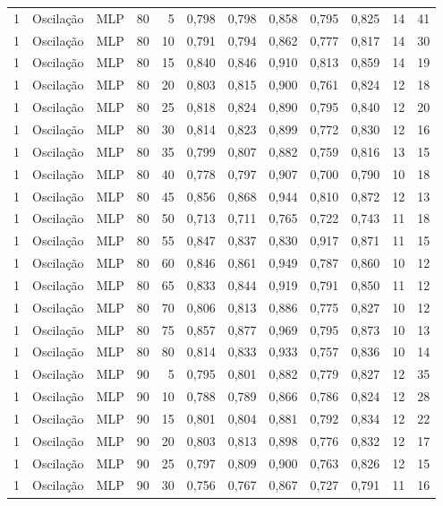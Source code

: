 \begin{longtable}{ccclrrrrrrrr}
1 & Oscilação & MLP & 80 & 5 & 0,798 & 0,798 & 0,858 & 0,795 & 0,825 & 14 & 41 \\
1 & Oscilação & MLP & 80 & 10 & 0,791 & 0,794 & 0,862 & 0,777 & 0,817 & 14 & 30 \\
1 & Oscilação & MLP & 80 & 15 & 0,840 & 0,846 & 0,910 & 0,813 & 0,859 & 14 & 19 \\
1 & Oscilação & MLP & 80 & 20 & 0,803 & 0,815 & 0,900 & 0,761 & 0,824 & 12 & 18 \\
1 & Oscilação & MLP & 80 & 25 & 0,818 & 0,824 & 0,890 & 0,795 & 0,840 & 12 & 20 \\
1 & Oscilação & MLP & 80 & 30 & 0,814 & 0,823 & 0,899 & 0,772 & 0,830 & 12 & 16 \\
1 & Oscilação & MLP & 80 & 35 & 0,799 & 0,807 & 0,882 & 0,759 & 0,816 & 13 & 15 \\
1 & Oscilação & MLP & 80 & 40 & 0,778 & 0,797 & 0,907 & 0,700 & 0,790 & 10 & 18 \\
1 & Oscilação & MLP & 80 & 45 & 0,856 & 0,868 & 0,944 & 0,810 & 0,872 & 12 & 13 \\
1 & Oscilação & MLP & 80 & 50 & 0,713 & 0,711 & 0,765 & 0,722 & 0,743 & 11 & 18 \\
1 & Oscilação & MLP & 80 & 55 & 0,847 & 0,837 & 0,830 & 0,917 & 0,871 & 11 & 15 \\
1 & Oscilação & MLP & 80 & 60 & 0,846 & 0,861 & 0,949 & 0,787 & 0,860 & 10 & 12 \\
1 & Oscilação & MLP & 80 & 65 & 0,833 & 0,844 & 0,919 & 0,791 & 0,850 & 11 & 12 \\
1 & Oscilação & MLP & 80 & 70 & 0,806 & 0,813 & 0,886 & 0,775 & 0,827 & 10 & 12 \\
1 & Oscilação & MLP & 80 & 75 & 0,857 & 0,877 & 0,969 & 0,795 & 0,873 & 10 & 13 \\
1 & Oscilação & MLP & 80 & 80 & 0,814 & 0,833 & 0,933 & 0,757 & 0,836 & 10 & 14 \\
1 & Oscilação & MLP & 90 & 5 & 0,795 & 0,801 & 0,882 & 0,779 & 0,827 & 12 & 35 \\
1 & Oscilação & MLP & 90 & 10 & 0,788 & 0,789 & 0,866 & 0,786 & 0,824 & 12 & 28 \\
1 & Oscilação & MLP & 90 & 15 & 0,801 & 0,804 & 0,881 & 0,792 & 0,834 & 12 & 22 \\
1 & Oscilação & MLP & 90 & 20 & 0,803 & 0,813 & 0,898 & 0,776 & 0,832 & 12 & 17 \\
1 & Oscilação & MLP & 90 & 25 & 0,797 & 0,809 & 0,900 & 0,763 & 0,826 & 12 & 15 \\
1 & Oscilação & MLP & 90 & 30 & 0,756 & 0,767 & 0,867 & 0,727 & 0,791 & 11 & 16 \\

\end{longtable}
